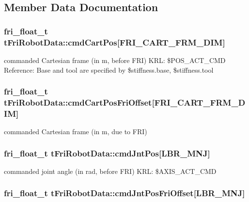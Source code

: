 \subsection{\-Member \-Data \-Documentation}
\hypertarget{structtFriRobotData_ae6eb0310ed8f76aad695fe7d806f6df7}{
\subsubsection[{cmd\-Cart\-Pos}]{\setlength{\rightskip}{0pt plus 5cm}fri\-\_\-float\-\_\-t {\bf t\-Fri\-Robot\-Data\-::cmd\-Cart\-Pos}\mbox{[}{\bf \-F\-R\-I\-\_\-\-C\-A\-R\-T\-\_\-\-F\-R\-M\-\_\-\-D\-I\-M}\mbox{]}}}\label{structtFriRobotData_ae6eb0310ed8f76aad695fe7d806f6df7}
commanded \-Cartesian frame (in m, before \-F\-R\-I) \-K\-R\-L\-: \$\-P\-O\-S\-\_\-\-A\-C\-T\-\_\-\-C\-M\-D \-Reference\-: \-Base and tool are specified by \$stiffness.\-base, \$stiffness.\-tool \hypertarget{structtFriRobotData_a357a2dd3e05e6ba0202961810a716168}{
\subsubsection[{cmd\-Cart\-Pos\-Fri\-Offset}]{\setlength{\rightskip}{0pt plus 5cm}fri\-\_\-float\-\_\-t {\bf t\-Fri\-Robot\-Data\-::cmd\-Cart\-Pos\-Fri\-Offset}\mbox{[}{\bf \-F\-R\-I\-\_\-\-C\-A\-R\-T\-\_\-\-F\-R\-M\-\_\-\-D\-I\-M}\mbox{]}}}\label{structtFriRobotData_a357a2dd3e05e6ba0202961810a716168}
commanded \-Cartesian frame (in m, due to \-F\-R\-I) \hypertarget{structtFriRobotData_af4551c91735454c0a474a913381df1a8}{
\subsubsection[{cmd\-Jnt\-Pos}]{\setlength{\rightskip}{0pt plus 5cm}fri\-\_\-float\-\_\-t {\bf t\-Fri\-Robot\-Data\-::cmd\-Jnt\-Pos}\mbox{[}{\bf \-L\-B\-R\-\_\-\-M\-N\-J}\mbox{]}}}\label{structtFriRobotData_af4551c91735454c0a474a913381df1a8}
commanded joint angle (in rad, before \-F\-R\-I) \-K\-R\-L\-: \$\-A\-X\-I\-S\-\_\-\-A\-C\-T\-\_\-\-C\-M\-D \hypertarget{structtFriRobotData_ab6f7bb28d6cb8899f360c1bae6d7cc24}{
\subsubsection[{cmd\-Jnt\-Pos\-Fri\-Offset}]{\setlength{\rightskip}{0pt plus 5cm}fri\-\_\-float\-\_\-t {\bf t\-Fri\-Robot\-Data\-::cmd\-Jnt\-Pos\-Fri\-Offset}\mbox{[}{\bf \-L\-B\-R\-\_\-\-M\-N\-J}\mbox{]}}}\label{structtFriRobotData_ab6f7bb28d6cb8899f360c1bae6d7cc24}
